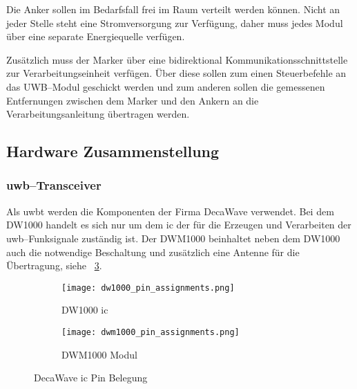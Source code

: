 Die Anker sollen im Bedarfsfall frei im Raum verteilt werden können. Nicht an jeder Stelle steht eine Stromversorgung zur Verfügung, daher muss jedes Modul über eine separate Energiequelle verfügen.

Zusätzlich muss der Marker über eine bidirektional Kommunikationsschnittstelle zur Verarbeitungseinheit verfügen. Über diese sollen zum einen Steuerbefehle an das UWB--Modul geschickt werden und zum anderen sollen die gemessenen Entfernungen zwischen dem Marker und den Ankern an die Verarbeitungsanleitung übertragen werden.


\begin{comment}
------------------------------------------------------------------------------------------
\end{comment}
\subsection{Hardware Zusammenstellung}


\begin{comment}
------------------------------------------------------------------------------------------
TODO: Wie wird der Vorwiderstand berechnet? ca. 10mA bei 1.8V, R=(U_0-U_LED)/I_LED

LED Vorwiderstand berechnen
	- https://www.youtube.com/watch?v=iNZj91TSRUg
	- DW1000 Datasheet - 5.9 General Purpose Input Output (GPIO)
\end{comment}
\subsubsection{\gls{uwb}--Transceiver}\label{subsec:uwb_transceiver}

Als \gls{uwbt} werden die Komponenten der Firma DecaWave verwendet. Bei dem DW1000 handelt es sich nur um dem \gls{ic} der für die Erzeugen und Verarbeiten der \gls{uwb}--Funksignale zuständig ist. Der DWM1000 beinhaltet neben dem DW1000 auch die notwendige Beschaltung und zusätzlich eine Antenne für die Übertragung, siehe \figurename~\ref{fig:pin_assignment}.

\begin{figure}
	\begin{subfigure}[t]{0.4\textwidth}
		\texttt{[image: dw1000\_pin\_assignments.png]}
		\caption{DW1000 \gls{ic}}
		\label{fig:dw1000_pin_assignments}
	\end{subfigure}
	\hfill
	\begin{subfigure}[t]{0.4\textwidth}
		\texttt{[image: dwm1000\_pin\_assignments.png]}
		\caption{DWM1000 Modul}
		\label{fig:dwm1000_pin_assignments}
	\end{subfigure}
	\caption{DecaWave \gls{ic} Pin Belegung}
	\label{fig:pin_assignment}
\end{figure}

